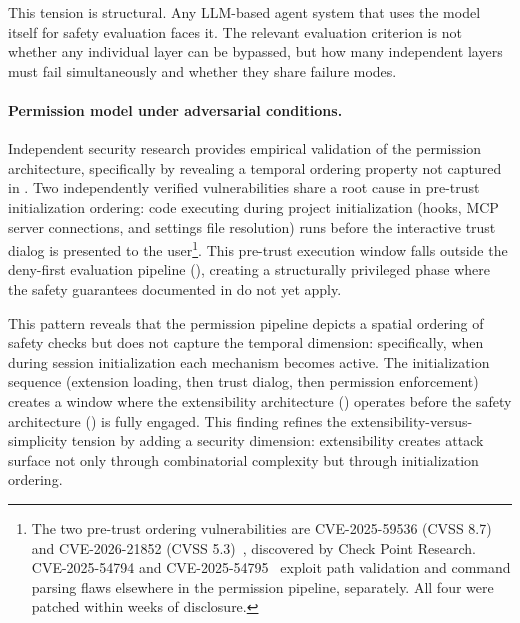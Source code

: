 This tension is structural. Any LLM-based agent system that uses the model itself for safety evaluation faces it. The relevant evaluation criterion is not whether any individual layer can be bypassed, but how many independent layers must fail simultaneously and whether they share failure modes.

\paragraph{Permission model under adversarial conditions.}

Independent security research provides empirical validation of the permission architecture, specifically by revealing a temporal ordering property not captured in . Two independently verified vulnerabilities share a root cause in pre-trust initialization ordering: code executing during project initialization (hooks, MCP server connections, and settings file resolution) runs before the interactive trust dialog is presented to the user\footnote{The two pre-trust ordering vulnerabilities are CVE-2025-59536 (CVSS 8.7) and CVE-2026-21852 (CVSS 5.3)~\citep{checkpoint2026rce}, discovered by Check Point Research. CVE-2025-54794 and CVE-2025-54795~\citep{cymulate2025inverseprompt} exploit path validation and command parsing flaws elsewhere in the permission pipeline, separately. All four were patched within weeks of disclosure.}. This pre-trust execution window falls outside the deny-first evaluation pipeline (), creating a structurally privileged phase where the safety guarantees documented in  do not yet apply.

This pattern reveals that the permission pipeline depicts a spatial ordering of safety checks but does not capture the temporal dimension: specifically, when during session initialization each mechanism becomes active. The initialization sequence (extension loading, then trust dialog, then permission enforcement) creates a window where the extensibility architecture () operates before the safety architecture () is fully engaged. This finding refines the extensibility-versus-simplicity tension by adding a security dimension: extensibility creates attack surface not only through combinatorial complexity but through initialization ordering.

